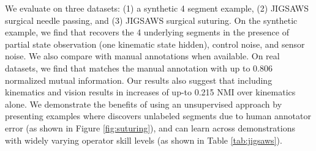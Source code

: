 \documentclass[0-main.tex]{subfiles}
\begin{document}

We evaluate \tsc on three datasets: (1) a synthetic 4 segment example, (2) JIGSAWS surgical needle passing,  and (3) JIGSAWS surgical suturing.
On the synthetic example, we find that \tsc recovers the 4 underlying segments in the presence of partial state observation (one kinematic state hidden), control noise, and sensor noise. 
We also compare \tsc with manual annotations when available.
On real datasets, we find that \tsc matches the manual annotation with up to 0.806 normalized mutual information.
Our results also suggest that including kinematics and vision results in increases of up-to 0.215 NMI over kinematics alone.
We demonstrate the benefits of using an unsupervised approach by presenting examples where \tsc discovers unlabeled segments due to human annotator error (as shown in Figure \ref{fig:suturing}), and can learn across demonstrations with widely varying operator skill levels (as shown in Table \ref{tab:jigsaws}).
\end{document}
